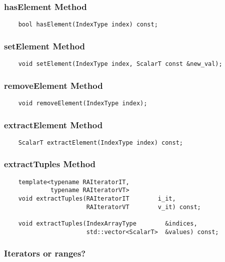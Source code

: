 \subsubsection{{\sf hasElement} Method}
\begin{verbatim}
    bool hasElement(IndexType index) const;
\end{verbatim}

\subsubsection{{\sf setElement} Method}
\begin{verbatim}
    void setElement(IndexType index, ScalarT const &new_val);
\end{verbatim}

\subsubsection{{\sf removeElement} Method}
\begin{verbatim}
    void removeElement(IndexType index);
\end{verbatim}

\subsubsection{{\sf extractElement} Method}
\begin{verbatim}
    ScalarT extractElement(IndexType index) const;
\end{verbatim}


\subsubsection{{\sf extractTuples} Method}
\begin{verbatim}
    template<typename RAIteratorIT,
             typename RAIteratorVT>
    void extractTuples(RAIteratorIT        i_it,
                       RAIteratorVT        v_it) const;

    void extractTuples(IndexArrayType        &indices,
                       std::vector<ScalarT>  &values) const;
\end{verbatim}

\subsubsection{Iterators or ranges?}

